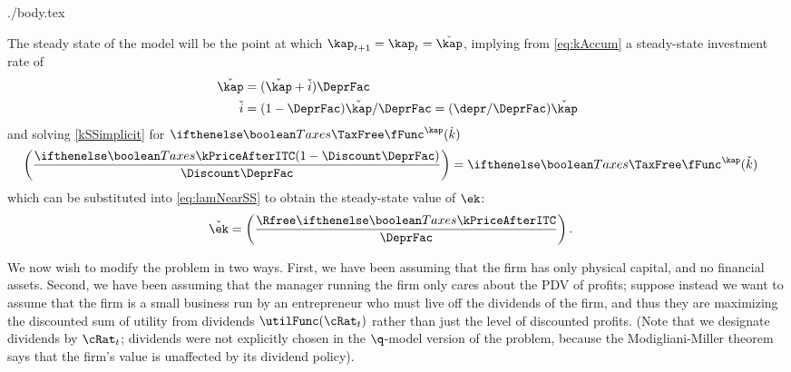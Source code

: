 \documentclass{handout}
\providecommand{\AnswerOrBlankSpace}{\ifthenelse{\boolean{SpaceBetweenAnswers}}}
\begin{document}
\begin{verbatimwrite}{./body.tex}
{The steady state of the model will be the point at which $\kap_{t+1}=\kap_{t}=\check{\kap}$, 
implying from \eqref{eq:kAccum} a steady-state investment rate of 
\begin{equation}\begin{gathered}\begin{aligned}
  \check{\kap} & =  (\check{\kap}+\check{i})\DeprFac
\\ \check{i} & =  (1-\DeprFac)\check{\kap}/\DeprFac = (\depr/\DeprFac) \check{\kap}
\label{eq:iSS}
\end{aligned}\end{gathered}\end{equation}
and solving \eqref{kSSimplicit} for $ \ifTax{\TaxFree}{}\fFunc^{\kap}(\check{k})$
\begin{equation}\begin{gathered}\begin{aligned}
 \left(\frac{\ifTax{\kPriceAfterITC}{}(1 - \Discount\DeprFac)}{\Discount \DeprFac}\right) & =   \ifTax{\TaxFree}{}\fFunc^{\kap}(\check{k})
\end{aligned}\end{gathered}\end{equation}
which can be substituted into \eqref{eq:lamNearSS} to obtain the steady-state 
value of $\ek$:
\begin{equation}\begin{gathered}\begin{aligned}
\check{\ek} & =   \left(\frac{\Rfree \ifTax{\kPriceAfterITC}{}}{\DeprFac}\right) .
\end{aligned}\end{gathered}\end{equation}

}{\AnswerOrBlankSpace{\clearpage\vfill\eject}{\vspace{0.0in}}}{}


We now wish to modify the problem in two ways.  First, we have been
assuming that the firm has only physical capital, and no financial
assets.  Second, we have been assuming that the manager running the
firm only cares about the PDV of profits; suppose instead we want to
assume that the firm is a small business run by an entrepreneur who
must live off the dividends of the firm, and thus they are maximizing
the discounted sum of utility from dividends $\utilFunc(\cRat_t)$
rather than just the level of discounted profits.  (Note that we
designate dividends by $\cRat_{t}$; dividends were not explicitly
chosen in the $\q$-model version of the problem, because the
Modigliani-Miller theorem says that the firm's value is unaffected by
its dividend policy).


\end{verbatimwrite}
\end{document}
